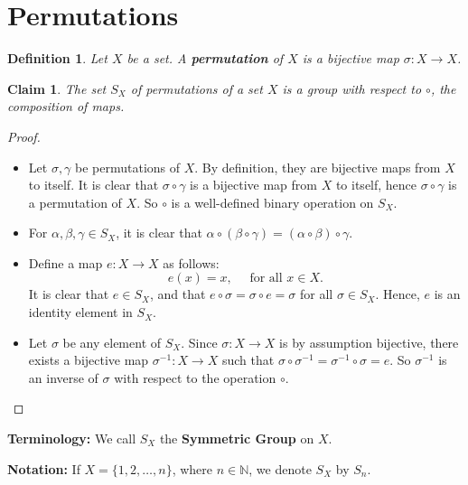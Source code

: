 \documentclass[a4paper,12pt]{report}
\newcommand{\ra}{\longrightarrow}
\newcounter{statement}
\numberwithin{statement}{chapter}
\newtheorem{defn}[statement]{Definition}
\newtheorem{claim}[statement]{Claim}
\numberwithin{equation}{chapter}
\numberwithin{section}{chapter}
\numberwithin{subsection}{section}
\begin{document}
\section{Permutations}

\begin{defn}
Let $X$ be a set.  A  {\bf permutation}  of $X$ is a bijective map $\sigma : X \ra X$.
\end{defn}
\begin{claim}

The set $S_X$ of permutations of a set $X$
is a group with respect to $\circ$, the composition of maps.

\end{claim}
\begin{proof}

\begin{itemize}
\item 
Let $\sigma, \gamma$ be permutations of $X$.
By definition, they are bijective maps from $X$ to itself.
It is clear that $\sigma\circ\gamma$ is a bijective map from $X$ to itself,
hence $\sigma\circ\gamma$ is a permutation of $X$.  So $\circ$ is a well-defined
binary operation on $S_X$.

\item 
For $\alpha, \beta, \gamma \in S_X$, it is clear that
$\alpha\circ(\beta\circ \gamma) = (\alpha\circ\beta)\circ\gamma$.

\item 
Define a map $e : X \ra X$ as follows:
\[
e(x) = x,\quad \text{ for all } x \in X.
\]
It is clear that $e \in S_X$, and that $e \circ \sigma = \sigma\circ e = \sigma$
for all $\sigma \in S_X$.  Hence, $e$ is an identity element in $S_X$.

\item 
Let $\sigma$ be any element of $S_X$.  Since $\sigma : X \ra X$ is by assumption bijective,
there exists a bijective map $\sigma^{-1} : X \ra X$
such that $\sigma\circ\sigma^{-1} = \sigma^{-1}\circ \sigma = e$.
So $\sigma^{-1}$
is an inverse of $\sigma$ with respect to the operation $\circ$.
\end{itemize}


\end{proof}




 {\bf Terminology:} 
We call $S_X$ the  {\bf Symmetric Group}  on $X$.



 {\bf Notation:} 
If $X = \{1, 2, \ldots, n\}$, where $n \in \mathbb{N}$,
we denote $S_X$ by $S_n$.
\end{document}
